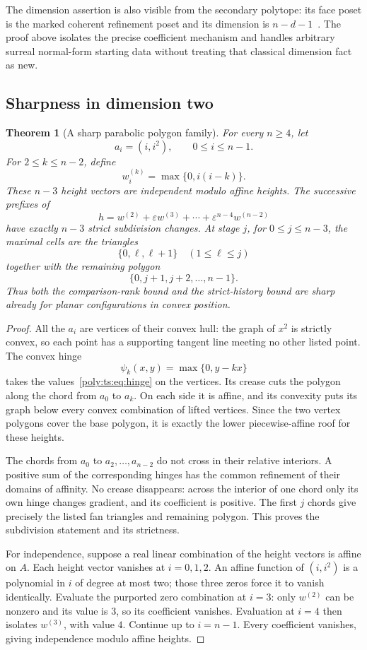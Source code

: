 \documentclass[11pt,a4paper]{article}
\numberwithin{equation}{section}
\newtheorem{theorem}{Theorem}[section]
\theoremstyle{plain}
\newcommand{\eps}{\varepsilon}
\begin{document}
The dimension assertion is also visible from the secondary polytope:
its face poset is the marked coherent refinement poset and its dimension
is $n-d-1$~\cite[Theorem 16.4.1]{ts:LS}. The proof above isolates the precise
coefficient mechanism and handles arbitrary surreal normal-form starting
data without treating that classical dimension fact as new.

\subsection{Sharpness in dimension two}\label{poly:ts:sec:sharp}
\begin{theorem}[A sharp parabolic polygon family]\label{poly:ts:thm:sharp}
For every $n\ge4$, let
\[
 a_i=(i,i^2),\qquad 0\le i\le n-1.
\]
For $2\le k\le n-2$, define
\begin{equation}\label{poly:ts:eq:hinge}
 w^{(k)}_i=\max\{0,i(i-k)\}.
\end{equation}
These $n-3$ height vectors are independent modulo affine heights.
The successive prefixes of
\[
 h=w^{(2)}+\eps w^{(3)}+\cdots+\eps^{n-4}w^{(n-2)}
\]
have exactly $n-3$ strict subdivision changes. At stage $j$, for
$0\le j\le n-3$, the maximal cells are the triangles
\[
 \{0,\ell,\ell+1\}\quad(1\le\ell\le j)
\]
together with the remaining polygon
\[
 \{0,j+1,j+2,\ldots,n-1\}.
\]
Thus both the comparison-rank bound and the strict-history bound are sharp
already for planar configurations in convex position.
\end{theorem}
\begin{proof}
All the $a_i$ are vertices of their convex hull: the graph of $x^2$ is
strictly convex, so each point has a supporting tangent line meeting no
other listed point. The convex hinge
\[
 \psi_k(x,y)=\max\{0,y-kx\}
\]
takes the values~\eqref{poly:ts:eq:hinge} on the vertices. Its crease cuts the
polygon along the chord from $a_0$ to $a_k$. On each side it is affine,
and its convexity puts its graph below every convex combination of lifted
vertices. Since the two vertex polygons cover the base polygon, it is
exactly the lower piecewise-affine roof for these heights.

The chords from $a_0$ to $a_2,\ldots,a_{n-2}$ do not cross in their
relative interiors. A positive sum of the corresponding hinges has the
common refinement of their domains of affinity. No crease disappears:
across the interior of one chord only its own hinge changes gradient,
and its coefficient is positive. The first $j$ chords give precisely
the listed fan triangles and remaining polygon. This proves the
subdivision statement and its strictness.

For independence, suppose a real linear combination of the height vectors
is affine on $A$. Each height vector vanishes at $i=0,1,2$. An affine
function of $(i,i^2)$ is a polynomial in $i$ of degree at most two; those
three zeros force it to vanish identically. Evaluate the purported zero
combination at $i=3$: only $w^{(2)}$ can be nonzero and its value is $3$,
so its coefficient vanishes. Evaluation at $i=4$ then isolates
$w^{(3)}$, with value $4$. Continue up to $i=n-1$. Every coefficient
vanishes, giving independence modulo affine heights.
\end{proof}
\end{document}

